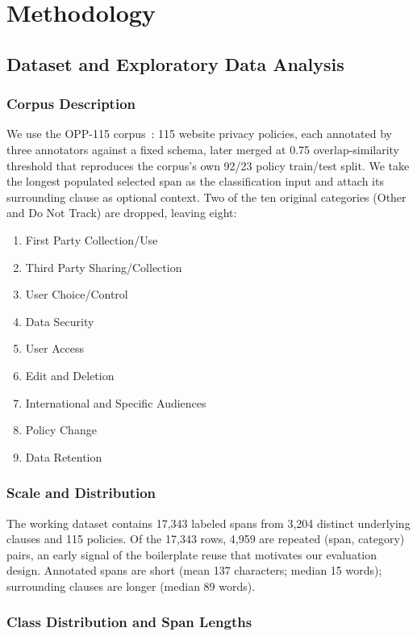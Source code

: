 \documentclass[11pt]{article}
\begin{document}
\section{Methodology}

\subsection{Dataset and Exploratory Data Analysis}

\subsubsection{Corpus Description}

We use the OPP-115 corpus~\cite{wilson-etal-2016-creation}: 115 website privacy policies, each annotated by three annotators against a fixed schema, later merged at 0.75 overlap-similarity threshold that reproduces the corpus's own 92/23 policy train/test split. We take the longest populated selected span as the classification input and attach its surrounding clause as optional context. Two of the ten original categories (Other and Do Not Track) are dropped, leaving eight:
\begin{enumerate}
\item First Party Collection/Use
\item Third Party Sharing/Collection
\item User Choice/Control
\item Data Security
\item User Access
\item Edit and Deletion
\item International and Specific Audiences
\item Policy Change
\item Data Retention
\end{enumerate}

\subsubsection{Scale and Distribution}

The working dataset contains 17,343 labeled spans from 3,204 distinct underlying clauses and 115 policies. Of the 17,343 rows, 4,959 are repeated (span, category) pairs, an early signal of the boilerplate reuse that motivates our evaluation design. Annotated spans are short (mean 137 characters; median 15 words); surrounding clauses are longer (median 89 words).

\subsubsection{Class Distribution and Span Lengths}
\end{document}
